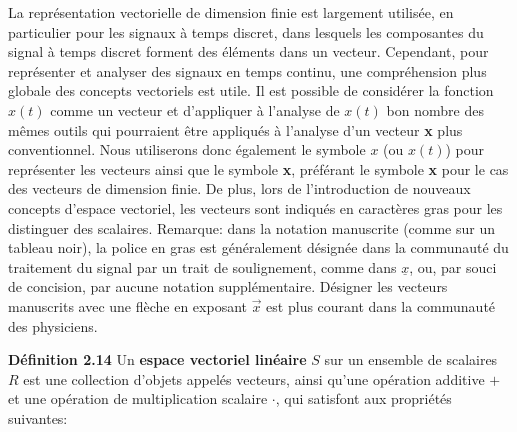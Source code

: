 \documentclass[10pt,twoside,a4paper]{book}
\begin{document}
La représentation vectorielle de dimension finie est largement utilisée, en particulier pour les signaux à temps discret, dans lesquels les composantes du signal à temps discret forment des éléments dans un vecteur. 
Cependant, pour représenter et analyser des signaux en temps continu, une compréhension plus globale des concepts vectoriels est utile. 
Il est possible de considérer la fonction $x(t)$ comme un vecteur et d'appliquer à l'analyse de $x(t)$ bon nombre des mêmes outils qui pourraient être appliqués à l'analyse d'un vecteur \textbf{x} plus conventionnel. 
Nous utiliserons donc également le symbole $x$ (ou $x(t)$) pour représenter les vecteurs ainsi que le symbole \textbf{x}, préférant le symbole \textbf{x} pour le cas des vecteurs de dimension finie. 
De plus, lors de l'introduction de nouveaux concepts d'espace vectoriel, les vecteurs sont indiqués en caractères gras pour les distinguer des scalaires. 
Remarque: dans la notation manuscrite (comme sur un tableau noir), la police en gras est généralement désignée dans la communauté du traitement du signal par un trait de soulignement, comme dans $\underline{x}$, ou, par souci de concision, par aucune notation supplémentaire. 
Désigner les vecteurs manuscrits avec une flèche en exposant $\overrightarrow{x}$ est plus courant dans la communauté des physiciens.

\vspace{4mm}
\noindent
\textbf{Définition 2.14} Un \textbf{espace vectoriel linéaire} $S$ sur un ensemble de scalaires $R$ est une collection d'objets appelés vecteurs, ainsi qu'une opération additive $+$ et une opération de multiplication scalaire $\cdot$, qui satisfont aux propriétés suivantes:

\renewcommand*{\thefootnote}{\arabic{footnote}}
\setcounter{footnote}{0}
\end{document}
